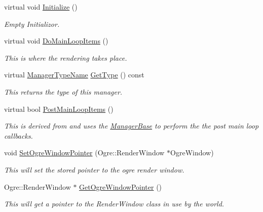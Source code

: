 \begin{DoxyCompactItemize}
virtual void \hyperlink{classphys_1_1GraphicsManager_a554572de5d1cdce37aa1760d6e6e039c}{Initialize} ()
\begin{DoxyCompactList}\small\item\em Empty Initializor. \item\end{DoxyCompactList}\item 
virtual void \hyperlink{classphys_1_1GraphicsManager_a72e5dc563c6947cded348f19d3df41ee}{DoMainLoopItems} ()
\begin{DoxyCompactList}\small\item\em This is where the rendering takes place. \item\end{DoxyCompactList}\item 
virtual \hyperlink{classphys_1_1ManagerBase_aaa6ccddf23892eaccb898529414f80a5}{ManagerTypeName} \hyperlink{classphys_1_1GraphicsManager_abf48faad2e09cd564442e66bc0473e58}{GetType} () const 
\begin{DoxyCompactList}\small\item\em This returns the type of this manager. \item\end{DoxyCompactList}\item 
virtual bool \hyperlink{classphys_1_1GraphicsManager_ae2330172be150cd4d12aa2ed62b0474c}{PostMainLoopItems} ()
\begin{DoxyCompactList}\small\item\em This is derived from and uses the \hyperlink{classphys_1_1ManagerBase}{ManagerBase} to perform the the post main loop callbacks. \item\end{DoxyCompactList}\item 
void \hyperlink{classphys_1_1GraphicsManager_ae08ff0d9f16d7b9bc35d2399c1389e6a}{SetOgreWindowPointer} (Ogre::RenderWindow $\ast$OgreWindow)
\begin{DoxyCompactList}\small\item\em This will set the stored pointer to the ogre render window. \item\end{DoxyCompactList}\item 
Ogre::RenderWindow $\ast$ \hyperlink{classphys_1_1GraphicsManager_a56d2f5d2ad9fb277723facd7f54034ec}{GetOgreWindowPointer} ()
\begin{DoxyCompactList}\small\item\em This will get a pointer to the RenderWindow class in use by the world. \item\end{DoxyCompactList}\end{DoxyCompactItemize}


